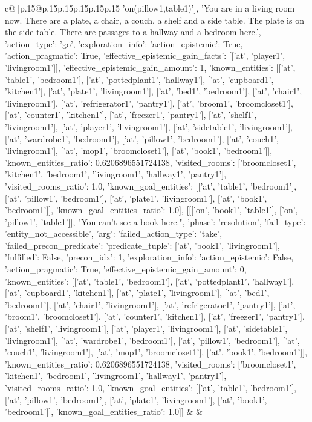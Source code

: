 \documentclass{article}
\begin{document}
{\begin{supertabular}{c@{$\;$}|p{.15\linewidth}@{}p{.15\linewidth}p{.15\linewidth}p{.15\linewidth}p{.15\linewidth}p{.15\linewidth}}
{{{'on(pillow1,table1)'], 'You are in a living room now. There are a plate, a chair, a couch, a shelf and a side table. The plate is on the side table. There are passages to a hallway and a bedroom here.', {'action_type': 'go', 'exploration_info': {'action_epistemic': True, 'action_pragmatic': True, 'effective_epistemic_gain_facts': [['at', 'player1', 'livingroom1']], 'effective_epistemic_gain_amount': 1, 'known_entities': [['at', 'table1', 'bedroom1'], ['at', 'pottedplant1', 'hallway1'], ['at', 'cupboard1', 'kitchen1'], ['at', 'plate1', 'livingroom1'], ['at', 'bed1', 'bedroom1'], ['at', 'chair1', 'livingroom1'], ['at', 'refrigerator1', 'pantry1'], ['at', 'broom1', 'broomcloset1'], ['at', 'counter1', 'kitchen1'], ['at', 'freezer1', 'pantry1'], ['at', 'shelf1', 'livingroom1'], ['at', 'player1', 'livingroom1'], ['at', 'sidetable1', 'livingroom1'], ['at', 'wardrobe1', 'bedroom1'], ['at', 'pillow1', 'bedroom1'], ['at', 'couch1', 'livingroom1'], ['at', 'mop1', 'broomcloset1'], ['at', 'book1', 'bedroom1']], 'known_entities_ratio': 0.6206896551724138, 'visited_rooms': ['broomcloset1', 'kitchen1', 'bedroom1', 'livingroom1', 'hallway1', 'pantry1'], 'visited_rooms_ratio': 1.0, 'known_goal_entities': [['at', 'table1', 'bedroom1'], ['at', 'pillow1', 'bedroom1'], ['at', 'plate1', 'livingroom1'], ['at', 'book1', 'bedroom1']], 'known_goal_entities_ratio': 1.0}}], [[['on', 'book1', 'table1'], ['on', 'pillow1', 'table1']], "You can't see a book here.", {'phase': 'resolution', 'fail_type': 'entity_not_accessible', 'arg': {'failed_action_type': 'take', 'failed_precon_predicate': {'predicate_tuple': ['at', 'book1', 'livingroom1'], 'fulfilled': False, 'precon_idx': 1}}, 'exploration_info': {'action_epistemic': False, 'action_pragmatic': True, 'effective_epistemic_gain_amount': 0, 'known_entities': [['at', 'table1', 'bedroom1'], ['at', 'pottedplant1', 'hallway1'], ['at', 'cupboard1', 'kitchen1'], ['at', 'plate1', 'livingroom1'], ['at', 'bed1', 'bedroom1'], ['at', 'chair1', 'livingroom1'], ['at', 'refrigerator1', 'pantry1'], ['at', 'broom1', 'broomcloset1'], ['at', 'counter1', 'kitchen1'], ['at', 'freezer1', 'pantry1'], ['at', 'shelf1', 'livingroom1'], ['at', 'player1', 'livingroom1'], ['at', 'sidetable1', 'livingroom1'], ['at', 'wardrobe1', 'bedroom1'], ['at', 'pillow1', 'bedroom1'], ['at', 'couch1', 'livingroom1'], ['at', 'mop1', 'broomcloset1'], ['at', 'book1', 'bedroom1']], 'known_entities_ratio': 0.6206896551724138, 'visited_rooms': ['broomcloset1', 'kitchen1', 'bedroom1', 'livingroom1', 'hallway1', 'pantry1'], 'visited_rooms_ratio': 1.0, 'known_goal_entities': [['at', 'table1', 'bedroom1'], ['at', 'pillow1', 'bedroom1'], ['at', 'plate1', 'livingroom1'], ['at', 'book1', 'bedroom1']], 'known_goal_entities_ratio': 1.0}}]] 
	  } 
	   } 
	   } 
	 & & \\ 
 


\end{supertabular}}
\end{document}
